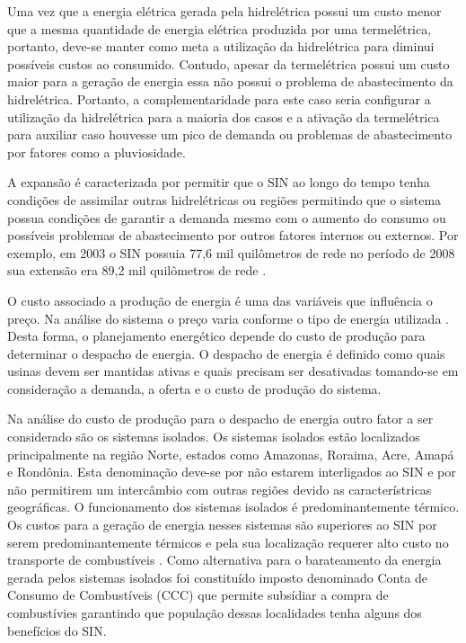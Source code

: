 Uma vez que a energia el\'etrica gerada pela hidrel\'etrica possui um custo menor
que a mesma quantidade de energia el\'etrica produzida por uma termel\'etrica, portanto, deve-se manter como meta a utiliza\c c\~ao
da hidrel\'etrica para diminui poss\'iveis custos ao consumido\cite{tom}. Contudo, apesar da termel\'etrica possui um
custo maior para a gera\c c\~ao de energia essa n\~ao possui o problema de abastecimento da hidrel\'etrica.
Portanto, a complementaridade para este caso seria configurar a utiliza\c c\~ao da hidrel\'etrica para a maioria dos
casos e a ativa\c c\~ao da termel\'etrica para auxiliar caso houvesse um pico de demanda ou problemas de
abastecimento por fatores como a pluviosidade.  

A expans\~ao \'e caracterizada por permitir que o SIN ao longo do tempo tenha condi\c c\~oes de assimilar outras hidrel\'etricas ou
regi\~oes permitindo que o sistema possua condi\c c\~oes de garantir a demanda mesmo com o aumento do consumo ou
poss\'iveis problemas de abastecimento por outros fatores internos ou externos. Por exemplo, em 2003 o SIN possuia 77,6
mil quil\^ometros de rede no per\'iodo de 2008 sua extens\~ao era 89,2 mil quil\^ometros de rede \cite{an}. 

O custo associado a produ\c c\~ao de energia \'e uma das vari\'aveis que influ\^encia o pre\c co. Na an\'alise do
sistema o pre\c co varia conforme o tipo de energia utilizada \cite{an}. Desta forma, o planejamento energ\'etico
depende do custo de produ\c c\~ao para determinar o despacho de energia. O despacho de energia \'e definido como quais
usinas devem ser mantidas ativas e quais precisam ser desativadas tomando-se em considera\c c\~ao a demanda, a oferta e
o custo de produ\c c\~ao do sistema.

Na an\'alise do custo de produ\c c\~ao para o despacho de energia outro fator a ser considerado s\~ao os sistemas
isolados. Os sistemas isolados est\~ao localizados principalmente na regi\~ao Norte,
estados como Amazonas, Roraima, Acre, Amap\'a e Rond\^onia. Esta denomina\c c\~ao deve-se por n\~ao estarem interligados ao
SIN e por n\~ao permitirem um interc\^ambio com outras regi\~oes devido as caracter\'istricas geogr\'aficas. O
funcionamento dos sistemas isolados \'e predominantemente t\'ermico. Os custos para a gera\c c\~ao de energia nesses sistemas s\~ao
superiores ao SIN por serem predominantemente t\'ermicos e pela sua localiza\c c\~ao requerer alto custo no
transporte de combust\'iveis \cite{an}. Como alternativa para o barateamento da energia gerada pelos sistemas isolados
foi constitu\'ido imposto denominado Conta de Consumo de Combust\'iveis (CCC)
que permite subs\'idiar a compra de
combust\'ivies garantindo que popula\c c\~ao dessas localidades tenha alguns dos benef\'icios do SIN. 

